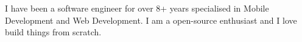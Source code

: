 \documentclass[9pt]{developercv} %
\begin{document}
\vspace{0.5cm}



\begin{minipage}[t]{0.4\textwidth} %
	\vspace{-\baselineskip} %
I have been a software engineer for over 8+ years specialised in  Mobile Development and Web Development. I am  a open-source enthusiast
and I love build things from scratch. 

\end{minipage}
\hfill %
\begin{minipage}[t]{0.5\textwidth} %
	\vspace{-\baselineskip} %
	\begin{barchart}{5.5}
	\end{barchart}
\end{minipage}


\end{document}
